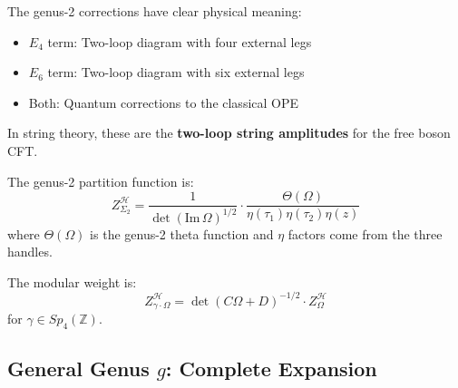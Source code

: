\begin{remark}\label{rem:genus-two-physical}
The genus-2 corrections have clear physical meaning:
\begin{itemize}
\item $E_4$ term: Two-loop diagram with four external legs
\item $E_6$ term: Two-loop diagram with six external legs
\item Both: Quantum corrections to the classical OPE
\end{itemize}

In string theory, these are the \textbf{two-loop string amplitudes} for the 
free boson CFT.
\end{remark}

\begin{computation}\label{comp:partition-genus-two}
The genus-2 partition function is:
\begin{equation}
Z_{\Sigma_2}^{\mathcal{H}} = \frac{1}{\det(\text{Im}\,\Omega)^{1/2}} 
\cdot \frac{\Theta(\Omega)}{\eta(\tau_1) \eta(\tau_2) \eta(z)}
\end{equation}
where $\Theta(\Omega)$ is the genus-2 theta function and $\eta$ factors come from 
the three handles.

The modular weight is:
$$Z_{\gamma \cdot \Omega}^{\mathcal{H}} = \det(C\Omega + D)^{-1/2} 
\cdot Z_{\Omega}^{\mathcal{H}}$$
for $\gamma \in Sp_4(\mathbb{Z})$.
\end{computation}

\subsection{General Genus $g$: Complete Expansion}
\label{subsec:heisenberg-general-genus}

